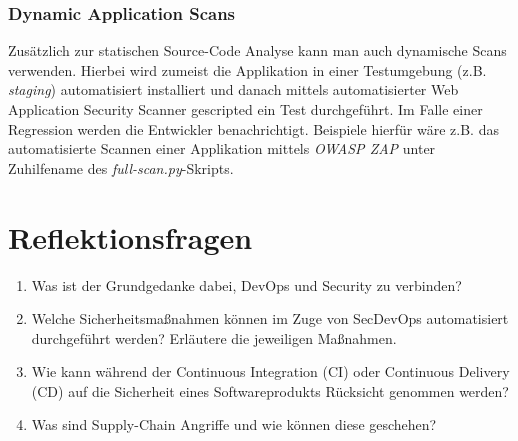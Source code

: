 \subsubsection{Dynamic Application Scans}

Zusätzlich zur statischen Source-Code Analyse kann man auch dynamische Scans verwenden. Hierbei wird zumeist die Applikation in einer Testumgebung (z.B. \textit{staging}) automatisiert installiert und danach mittels automatisierter Web Application Security Scanner gescripted ein Test durchgeführt. Im Falle einer Regression werden die Entwickler benachrichtigt. Beispiele hierfür wäre z.B. das automatisierte Scannen einer Applikation mittels \textit{OWASP ZAP} unter Zuhilfename des \textit{full-scan.py}-Skripts.

\section{Reflektionsfragen}

\begin{enumerate}
	\item Was ist der Grundgedanke dabei, DevOps und Security zu verbinden?
	\item Welche Sicherheitsmaßnahmen können im Zuge von SecDevOps automatisiert durchgeführt werden? Erläutere die jeweiligen Maßnahmen.
	\item Wie kann während der Continuous Integration (CI) oder Continuous Delivery (CD) auf die Sicherheit eines Softwareprodukts Rücksicht genommen werden?
	\item Was sind Supply-Chain Angriffe und wie können diese geschehen?
\end{enumerate}
